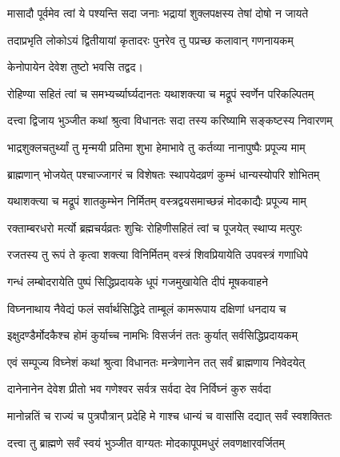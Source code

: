 \begin{center}
\twolineshloka
{मासादौ पूर्वमेव त्वां ये पश्यन्ति सदा जनाः}
{भद्रायां शुक्लपक्षस्य तेषां दोषो न जायते}%

\twolineshloka
{तदाप्रभृति लोकोऽयं द्वितीयायां कृतादरः}
{पुनरेव तु पप्रच्छ कलावान् गणनायकम्}%

{केनोपायेन देवेश तुष्टो भवसि तद्वद।}


\twolineshloka
{रोहिण्या सहितं त्वां च समभ्यर्च्यार्घ्यदानतः}
{यथाशक्त्या च मद्रूपं स्वर्णेन परिकल्पितम्}%

\twolineshloka
{दत्त्वा द्विजाय भुञ्जीत कथां श्रुत्वा विधानतः}
{सदा तस्य करिष्यामि सङ्कष्टस्य निवारणम्}%

\twolineshloka
{भाद्रशुक्लचतुर्थ्यां तु मृन्मयी प्रतिमा शुभा}
{हेमाभावे तु कर्तव्या नानापुष्पैः प्रपूज्य माम्}%

\twolineshloka
{ब्राह्मणान् भोजयेत् पश्चाज्जागरं च विशेषतः}
{स्थापयेदव्रणं कुम्भं धान्यस्योपरि शोभितम्}%

\twolineshloka
{यथाशक्त्या च मद्रूपं शातकुम्भेन निर्मितम्}
{वस्त्रद्वयसमाच्छन्नं मोदकाद्यैः प्रपूज्य माम्}%

\twolineshloka
{रक्ताम्बरधरो मर्त्यो ब्रह्मचर्यव्रतः शुचिः}
{रोहिणीसहितं त्वां च पूजयेत् स्थाप्य मत्पुरः}%

\twolineshloka
{रजतस्य तु रूपं ते कृत्वा शक्त्या विनिर्मितम्}
{वस्त्रं शिवप्रियायेति उपवस्त्रं गणाधिपे}%

\twolineshloka
{गन्धं लम्बोदरायेति पुष्पं सिद्धिप्रदायके}
{धूपं गजमुखायेति दीपं मूषकवाहने}%

\twolineshloka
{विघ्ननाथाय नैवेद्यं फलं सर्वार्थसिद्धिदे}
{ताम्बूलं कामरूपाय दक्षिणां धनदाय च}%

\twolineshloka
{इक्षुदण्डैर्मोदकैश्च होमं कुर्याच्च नामभिः}
{विसर्जनं ततः कुर्यात् सर्वसिद्धिप्रदायकम्}%

\twolineshloka
{एवं सम्पूज्य विघ्नेशं कथां श्रुत्वा विधानतः}
{मन्त्रेणानेन तत् सर्वं ब्राह्मणाय निवेदयेत्}%

\twolineshloka
{दानेनानेन देवेश प्रीतो भव गणेश्वर}
{सर्वत्र सर्वदा देव निर्विघ्नं कुरु सर्वदा}%

\twolineshloka
{मानोन्नतिं च राज्यं च पुत्रपौत्रान् प्रदेहि मे}
{गाश्च धान्यं च वासांसि दद्यात् सर्वं स्वशक्तितः}%

\twolineshloka
{दत्त्वा तु ब्राह्मणे सर्वं स्वयं भुञ्जीत वाग्यतः}
{मोदकापूपमधुरं लवणक्षारवर्जितम्}%


\end{center}

